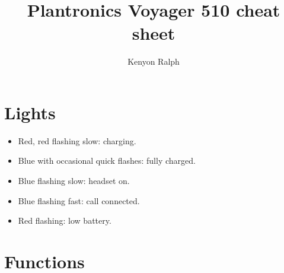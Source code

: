 \documentclass{article}
\title{Plantronics Voyager 510 cheat sheet}
\author{Kenyon Ralph}
\begin{document}
\maketitle

\section{Lights}
\label{sec:lights}

\begin{itemize}
\item Red, red flashing slow: charging.
\item Blue with occasional quick flashes: fully charged.
\item Blue flashing slow: headset on.
\item Blue flashing fast: call connected.
\item Red flashing: low battery.
\end{itemize}

\section{Functions}
\label{sec:functions}
\end{document}

